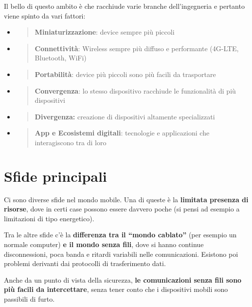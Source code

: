 Il bello di questo ambito è che racchiude varie branche dell'ingegneria
e pertanto viene spinto da vari fattori:

\begin{itemize}
\item
  \begin{quote}
  \textbf{Miniaturizzazione}: device sempre più piccoli
  \end{quote}
\item
  \begin{quote}
  \textbf{Connettività}: Wireless sempre più diffuso e performante
  (4G-LTE, Bluetooth, WiFi)
  \end{quote}
\item
  \begin{quote}
  \textbf{Portabilità}: device più piccoli sono più facili da
  trasportare
  \end{quote}
\item
  \begin{quote}
  \textbf{Convergenza}: lo stesso dispositivo racchiude le funzionalità
  di più dispositivi
  \end{quote}
\item
  \begin{quote}
  \textbf{Divergenza:} creazione di dispositivi altamente specializzati
  \end{quote}
\item
  \begin{quote}
  \textbf{App e Ecosistemi digitali}: tecnologie e applicazioni che
  interagiscono tra di loro
  \end{quote}
\end{itemize}

\section{Sfide principali}

Ci sono diverse sfide nel mondo mobile. Una di  queste è la \textbf{limitata 
presenza di risorse}, dove in certi case possono essere davvero poche (si pensi 
ad esempio a limitazioni di tipo energetico).

Tra le altre sfide c'è la \textbf{differenza tra il ``mondo cablato''} (per 
esempio un normale computer) \textbf{e il mondo senza fili}, dove si hanno 
continue disconnessioni, poca banda e ritardi variabili nelle comunicazioni. 
Esistono poi problemi derivanti dai protocolli di trasferimento dati.

Anche da un punto di vista della sicurezza, \textbf{le comunicazioni senza fili 
sono più facili da intercettare}, senza tener conto che i dispositivi mobili 
sono passibili di furto.

